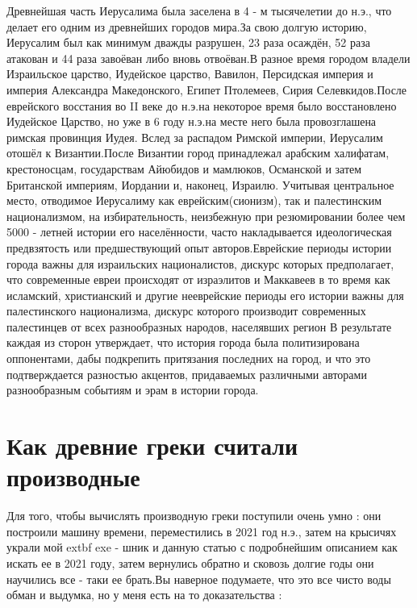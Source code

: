 \documentclass[a4paper,12pt]{article}
\begin{document}
Древнейшая часть Иерусалима была заселена в 4 - м тысячелетии до н.э., что делает его одним из древнейших городов мира.За свою долгую историю, Иерусалим был как минимум дважды разрушен, 23 раза осаждён, 52 раза атакован и 44 раза завоёван либо вновь отвоёван.В разное время городом владели Израильское царство, Иудейское царство, Вавилон, Персидская империя и империя Александра Македонского, Египет Птолемеев, Сирия Селевкидов.После еврейского восстания во II веке до н.э.на некоторое время было восстановлено Иудейское Царство, но уже в 6 году н.э.на месте него была провозглашена римская провинция Иудея. Вслед за распадом Римской империи, Иерусалим отошёл к Византии.После Византии город принадлежал арабским халифатам, крестоносцам, государствам Айюбидов и мамлюков, Османской и затем Британской империям, Иордании и, наконец, Израилю. Учитывая центральное место, отводимое Иерусалиму как еврейским(сионизм), так и палестинским национализмом, на избирательность, неизбежную при резюмировании более чем 5000 - летней истории его населённости, часто накладывается идеологическая предвзятость или предшествующий опыт авторов.Еврейские периоды истории города важны для израильских националистов, дискурс которых предполагает, что современные евреи происходят от израэлитов и Маккавеев в то время как исламский, христианский и другие нееврейские периоды его истории важны для палестинского национализма, дискурс которого производит современных палестинцев от всех разнообразных народов, населявших регион В результате каждая из сторон утверждает, что история города была политизирована оппонентами, дабы подкрепить притязания последних на город, и что это подтверждается разностью акцентов, придаваемых различными авторами разнообразным событиям и эрам в истории города.

\section{Как древние греки считали производные}
Для того, чтобы вычислять производную греки поступили очень умно : они построили машину времени, переместились в 2021 год н.э., затем на крысичях украли мой 	extbf{ exe } - шник и данную статью с подробнейшим описанием как искать ее в 2021 году, затем вернулись обратно и сковозь долгие годы они научились все - таки ее брать.Вы наверное подумаете, что это все чисто воды обман и выдумка, но у меня есть на то доказательства : \newpage

 \begin{figure}[h]
 \label{ photo1:1 }
 \end{figure}
\end{document}

